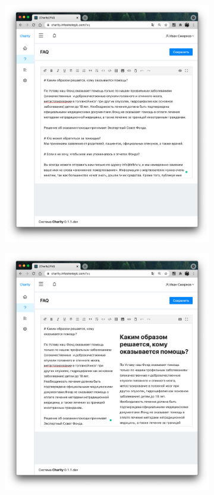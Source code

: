 \documentclass[a4paper,12pt,reqno]{article}
\begin{document}
	\begin{figure}[H]
		\centering
		\begin{subfigure}[b]{0.475\linewidth}
			\includegraphics[width=\linewidth]{img/ro/faq.png}
		\end{subfigure}
		\begin{subfigure}[b]{0.475\linewidth}
			\includegraphics[width=\linewidth]{img/ro/faq_1.png}

\end{subfigure}
\end{figure}
\end{document}
